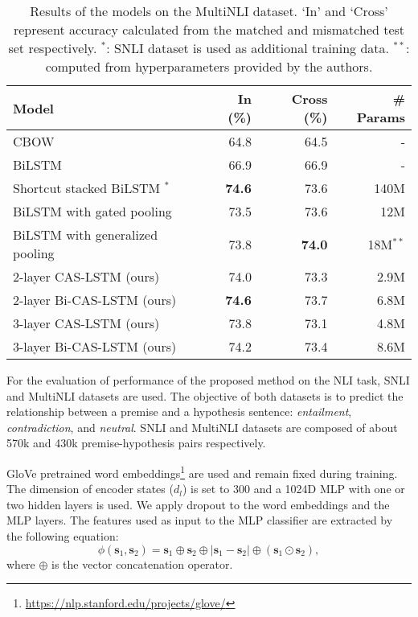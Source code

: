 \documentclass[wcp]{jmlr}
\begin{document}
    \begin{table*}[t]
        \centering
        \begin{tabular}{l r r r}
            \hline
            \bf{Model} & \bf{In (\%)} & \bf{Cross (\%)} & \bf{\# Params} \\
            \hline
            CBOW \citep{williams2018mnli} & 64.8 & 64.5 & - \\
            BiLSTM \citep{williams2018mnli} & 66.9 & 66.9 & - \\
            Shortcut stacked BiLSTM \citep{nie2017shortcut}$^\ast$ & \bf{74.6} & 73.6 & 140M \\
            BiLSTM with gated pooling \citep{chen2017gated} & 73.5 & 73.6 & 12M \\
            BiLSTM with generalized pooling \citep{chen2018generalized} & 73.8 & \bf{74.0} & 18M$^{\ast\ast}$ \\
            \hline
            2-layer CAS-LSTM (ours) & 74.0 & 73.3 & 2.9M \\
            2-layer Bi-CAS-LSTM (ours) & \bf{74.6} & 73.7 & 6.8M \\
            3-layer CAS-LSTM (ours) & 73.8 & 73.1 & 4.8M \\
            3-layer Bi-CAS-LSTM (ours) & 74.2 & 73.4 & 8.6M \\
            \hline
        \end{tabular}
        \caption{Results of the models on the MultiNLI dataset.
            `In' and `Cross' represent accuracy calculated from the matched and mismatched test set respectively.
            $^\ast$: SNLI dataset is used as additional training data. $^{\ast\ast}$: computed from hyperparameters provided by the authors.}
        \label{table:mnli}
    \end{table*}
    
    For the evaluation of performance of the proposed method on the NLI task, SNLI \citep{bowman2015snli} and MultiNLI \citep{williams2018mnli} datasets are used.
    The objective of both datasets is to predict the relationship between a premise and a hypothesis sentence: \textit{entailment}, \textit{contradiction}, and \textit{neutral}.
    SNLI and MultiNLI datasets are composed of about 570k and 430k premise-hypothesis pairs respectively.
    
    GloVe pretrained word embeddings\footnote{\url{https://nlp.stanford.edu/projects/glove/}} \citep{pennington2014glove} are used and remain fixed during training.
    The dimension of encoder states ($d_l$) is set to 300 and a 1024D MLP with one or two hidden layers is used.
    We apply dropout \citep{srivastava2014dropout} to the word embeddings and the MLP layers.
    The features used as input to the MLP classifier are extracted by the following equation:
    \begin{equation}
    \label{eq:nli-matching}
    \phi(\mathbf{s}_1, \mathbf{s}_2) = \mathbf{s}_1 \oplus \mathbf{s}_2 \oplus |\mathbf{s}_1 - \mathbf{s}_2| \oplus (\mathbf{s}_1 \odot \mathbf{s}_2),
    \end{equation}
    where $\oplus$ is the vector concatenation operator.
    
\end{document}
